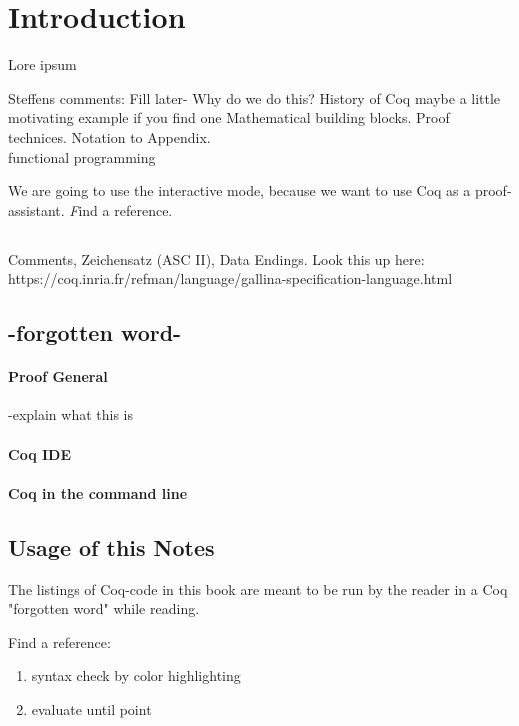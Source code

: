 \section{Introduction}



Lore ipsum \cite{PACGGHSY}

Steffens comments:
Fill later-
 Why do we do this?
 History of Coq
 maybe a little motivating example if you find one
 Mathematical building blocks. Proof technices. Notation to Appendix.\\
 \gls{functional programming}

We are going to use the interactive mode, because we want to use Coq as a proof-assistant. {\emph Find a reference.}

\subsection{}

Comments, Zeichensatz (ASC II), Data Endings.
Look this up here:\\
https://coq.inria.fr/refman/language/gallina-specification-language.html
\subsection{-forgotten word-}



\paragraph{Proof General}
-explain what this is


\paragraph{Coq IDE}

\paragraph{Coq in the command line}




\subsection{Usage of this Notes}


The listings of Coq-code in this book are meant to be run by the reader in a Coq "forgotten word" while reading.

Find a reference:
\begin{enumerate}
\item syntax check by color highlighting
\item evaluate until point
\end{enumerate}





